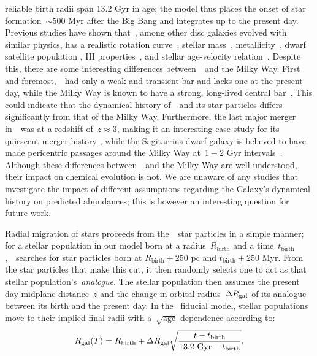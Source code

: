 reliable birth radii span 13.2 Gyr in age; the model thus places the onset of
star formation~$\sim$500 Myr after the Big Bang and integrates up to the
present day.
Previous studies have shown that~\hsim, among other disc galaxies evolved with
similar physics, has a realistic rotation curve~\citep{Governato2012,
Christensen2014a, Christensen2014b}, stellar mass~\citep{Munshi2013},
metallicity~\citep{Christensen2016}, dwarf satellite population
\citep{Zolotov2012, Brooks2014}, HI properties~\citep{Brooks2017}, and stellar
age-velocity relation~\citep{Bird2021}.
Despite this, there are some interesting differences between~\hsim~and the
Milky Way.
First and foremost,~\hsim~had only a weak and transient bar and lacks one at
the present day, while the Milky Way is known to have a strong, long-lived
central bar~\citep[e.g.][]{Bovy2019}.
This could indicate that the dynamical history of~\hsim~and its star particles
differs significantly from that of the Milky Way.
Furthermore, the last major merger in~\hsim~was at a redshift of~$z \approx 3$,
making it an interesting case study for its quiescent merger history
\citep[e.g.][]{Zolotov2012}, while the Sagitarrius dwarf galaxy is believed to
have made pericentric passages around the Milky Way at~$1 - 2$ Gyr
intervals~\citep{Law2010}.
Although these differences between~\hsim~and the Milky Way are well understood,
their impact on chemical evolution is not.
We are unaware of any studies that investigate the impact of different
assumptions regarding the Galaxy's dynamical history on predicted abundances;
this is however an interesting question for future work.
\par
Radial migration of stars proceeds from the~\hsim~star particles in a simple
manner; for a stellar population in our model born at a radius~$R_\text{birth}$
and a time~$t_\text{birth}$,~\vice~searches for star particles born at
$R_\text{birth} \pm 250$ pc and $t_\text{birth} \pm 250$ Myr.
From the star particles that make this cut, it then randomly selects one to act
as that stellar population's~\textit{analogue}.
The stellar population then assumes the present day midplane distance~$z$ and
the change in orbital radius~$\Delta R_\text{gal}$ of its analogue between its birth
and the present day.
In the~\citet{Johnson2021} fiducial model, stellar populations move to their
implied final radii with a~$\sqrt{\text{age}}$ dependence according to:
\begin{equation}
R_\text{gal}(T) = R_\text{birth} + \Delta R_\text{gal}
\sqrt{\frac{t - t_\text{birth}}{13.2~\text{Gyr} - t_\text{birth}}},
\end{equation}
